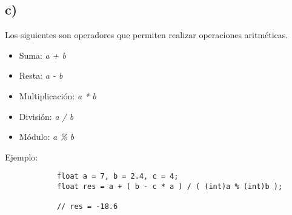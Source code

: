 \documentclass[10pt]{article}
\begin{document}
        \subsection*{c)}
        Los siguientes son operadores que permiten realizar operaciones aritméticas.
        \begin{itemize}
            \item Suma: \textit{a + b}
            \item Resta: \textit{a - b}
            \item Multiplicación: \textit{a * b}
            \item División: \textit{a / b}
            \item Módulo: \textit{a \% b}
        \end{itemize}
        Ejemplo: 
        \begin{verbatim}
            float a = 7, b = 2.4, c = 4;
            float res = a + ( b - c * a ) / ( (int)a % (int)b );
            
            // res = -18.6
        \end{verbatim}
\end{document}

